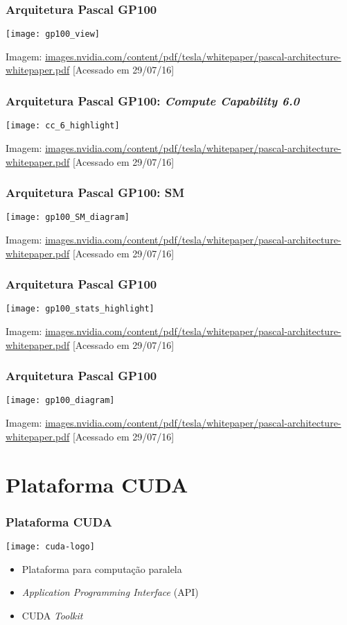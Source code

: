 \documentclass[10pt, compress]{beamer}
\begin{document}
\begin{frame}
    \frametitle{Arquitetura Pascal GP100}
    \centering
    \texttt{[image: gp100\_view]}
    \vfill

    \tiny{Imagem: \url{images.nvidia.com/content/pdf/tesla/whitepaper/pascal-architecture-whitepaper.pdf} [Acessado em 29/07/16]}
\end{frame}

\begin{frame}
    \frametitle{Arquitetura Pascal GP100: \textit{Compute Capability 6.0}}
    \centering
    \texttt{[image: cc\_6\_highlight]}
    \vfill

    \tiny{Imagem: \url{images.nvidia.com/content/pdf/tesla/whitepaper/pascal-architecture-whitepaper.pdf} [Acessado em 29/07/16]}
\end{frame}

\begin{frame}
    \frametitle{Arquitetura Pascal GP100: SM}
    \centering
    \texttt{[image: gp100\_SM\_diagram]}
    \vfill

    \tiny{Imagem: \url{images.nvidia.com/content/pdf/tesla/whitepaper/pascal-architecture-whitepaper.pdf} [Acessado em 29/07/16]}
\end{frame}

\begin{frame}
    \frametitle{Arquitetura Pascal GP100}
    \centering
    \texttt{[image: gp100\_stats\_highlight]}
    \vfill

    \tiny{Imagem: \url{images.nvidia.com/content/pdf/tesla/whitepaper/pascal-architecture-whitepaper.pdf} [Acessado em 29/07/16]}
\end{frame}

\begin{frame}
    \frametitle{Arquitetura Pascal GP100}
    \centering
    \texttt{[image: gp100\_diagram]}
    \vfill

    \tiny{Imagem: \url{images.nvidia.com/content/pdf/tesla/whitepaper/pascal-architecture-whitepaper.pdf} [Acessado em 29/07/16]}
\end{frame}

\section{Plataforma CUDA}

\begin{frame}
    \frametitle{Plataforma CUDA}
    \begin{center}
        \texttt{[image: cuda-logo]}
    \end{center}

    \begin{itemize}
        \item Plataforma para \alert{computação paralela}
        \item \textit{Application Programming Interface} (API)
        \item CUDA \textit{Toolkit}
    \end{itemize}
\end{frame}
\end{document}
